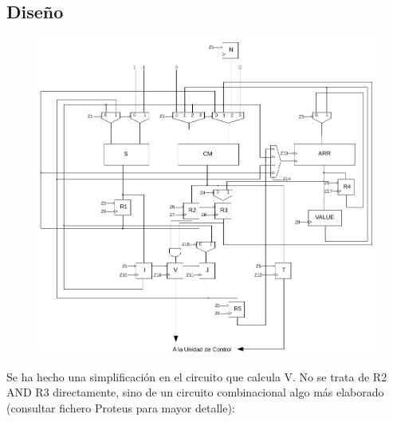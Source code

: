 \documentclass[12pt,a4paper,oneside]{article}
\begin{document}
\subsection{Diseño} \label{diseno}
\begin{figure}[H]
    \includegraphics[width = \textwidth]{ud_proceso.pdf}
\end{figure}

Se ha hecho una simplificación en el circuito que calcula V. No se trata de R2 AND R3 directamente, sino
de un circuito combinacional algo más elaborado (consultar fichero Proteus para mayor detalle):
\end{document}
